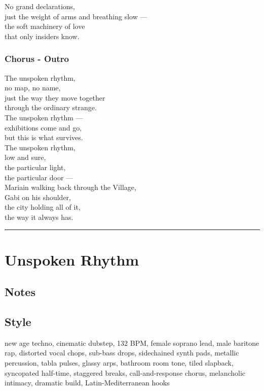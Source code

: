 \documentclass[]{article}
\begin{document}
No grand declarations,\\
just the weight of arms and breathing slow ---\\
the soft machinery of love\\
that only insiders know.

\subsubsection{Chorus - Outro}\label{chorus---outro}

The unspoken rhythm,\\
no map, no name,\\
just the way they move together\\
through the ordinary strange.\\
The unspoken rhythm ---\\
exhibitions come and go,\\
but this is what survives.\\
The unspoken rhythm,\\
low and sure,\\
the particular light,\\
the particular door ---\\
Mariain walking back through the Village,\\
Gabi on his shoulder,\\
the city holding all of it,\\
the way it always has.

\begin{center}\rule{0.5\linewidth}{0.5pt}\end{center}

\section{Unspoken Rhythm}\label{unspoken-rhythm}

\subsection{Notes}\label{notes-41}

\subsection{Style}\label{style-41}

new age techno, cinematic dubstep, 132 BPM, female soprano lead, male
baritone rap, distorted vocal chops, sub-bass drops, sidechained synth
pads, metallic percussion, tabla pulses, glassy arps, bathroom room
tone, tiled slapback, syncopated half-time, staggered breaks,
call-and-response chorus, melancholic intimacy, dramatic build,
Latin-Mediterranean hooks
\end{document}
